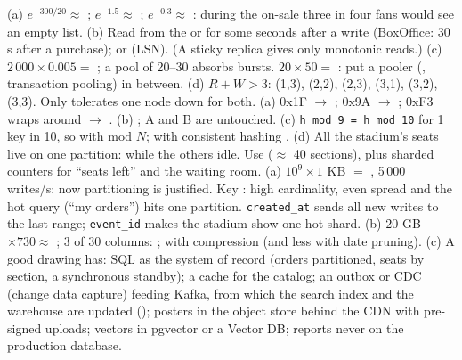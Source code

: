  (a) $e^{-300/20} \approx$ ; $e^{-1.5} \approx$ ; $e^{-0.3} \approx$ : during the on-sale three in four fans would see an empty list. (b) Read from the  or for some seconds after a write (BoxOffice: 30 s after a purchase); or  (LSN). (A sticky replica gives only monotonic reads.) (c) $2\,000 \times 0.005 =$ ; a pool of 20--30 absorbs bursts. $20 \times 50 =$ : put a pooler (, transaction pooling) in between. (d) $R + W > 3$: (1,3), (2,2), (2,3), (3,1), (3,2), (3,3). Only  tolerates one node down for both.
 (a) 0x1F $\to$ ; 0x9A $\to$ ; 0xF3 wraps around $\to$ . (b) ; A and B are untouched. (c) \texttt{h mod 9 = h mod 10} for 1 key in 10, so  with mod $N$; with consistent hashing . (d) All the stadium's seats live on one partition:  while the others idle. Use  ($\approx$ 40 sections), plus sharded counters for ``seats left'' and the waiting room.
 (a) $10^9 \times 1$ KB $=$ , 5\,000 writes/s: now partitioning is justified. Key : high cardinality, even spread and the hot query (``my orders'') hits one partition. \texttt{created\_at} sends all new writes to the last range; \texttt{event\_id} makes the stadium show one hot shard. (b) $20$ GB $\times 730 \approx$ ; 3 of 30 columns: ; with compression  (and less with date pruning). (c) A good drawing has: SQL as the system of record (orders partitioned, seats by section, a synchronous standby); a cache for the catalog; an outbox or CDC (change data capture) feeding Kafka, from which the search index and the warehouse are updated (); posters in the object store behind the CDN with pre-signed uploads; vectors in pgvector or a Vector DB; reports never on the production database.
